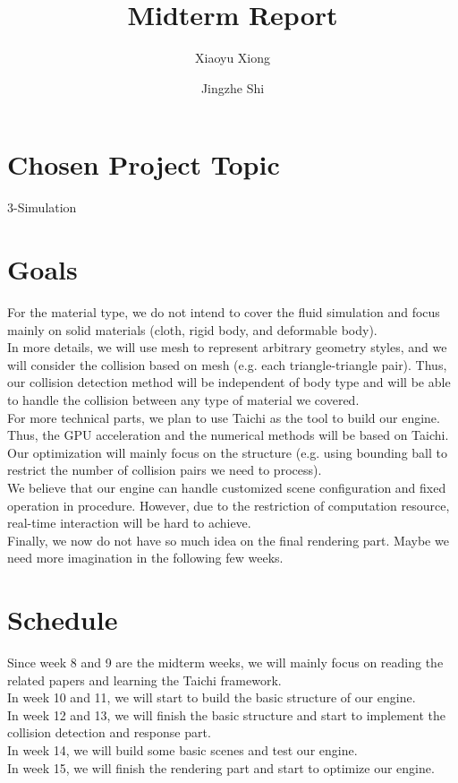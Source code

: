 \documentclass[SIGGRAPH]{acmart}
\begin{document}
\title{Midterm Report}
\author{Xiaoyu Xiong}
\author{Jingzhe Shi}
\maketitle

\section{Chosen Project Topic}
3-Simulation

\section{Goals}
For the material type, we do not intend to cover the fluid simulation and focus mainly on solid materials (cloth, rigid body, and deformable body).\\ 
In more details, we will use mesh to represent arbitrary geometry styles, and we will consider the collision based on mesh (e.g. each triangle-triangle pair). Thus, our collision detection method will be independent of body type and will be able to handle the collision between any type of material we covered.\\
For more technical parts, we plan to use Taichi as the tool to build our engine. Thus, the GPU acceleration and the numerical methods will be based on Taichi. Our optimization will mainly focus on the structure (e.g. using bounding ball to restrict the number of collision pairs we need to process).\\
We believe that our engine can handle customized scene configuration and fixed operation in procedure. However, due to the restriction of computation resource, real-time interaction will be hard to achieve.\\
Finally, we now do not have so much idea on the final rendering part. Maybe we need more imagination in the following few weeks.

\section{Schedule}
Since week 8 and 9 are the midterm weeks, we will mainly focus on reading the related papers and learning the Taichi framework.\\
In week 10 and 11, we will start to build the basic structure of our engine.\\
In week 12 and 13, we will finish the basic structure and start to implement the collision detection and response part.\\
In week 14, we will build some basic scenes and test our engine.\\
In week 15, we will finish the rendering part and start to optimize our engine.\\
\end{document}

